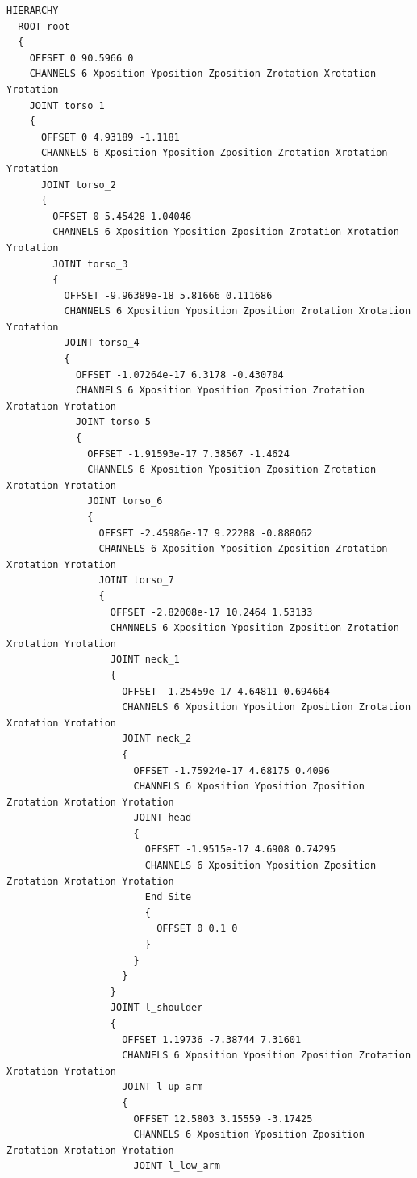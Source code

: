 \documentclass[a4j, fleqn, 12pt]{jsreport}
\begin{document}
\begin{lstlisting}[caption=mocopiのBVHファイル,label=BVH]
  HIERARCHY
  ROOT root
  {
    OFFSET 0 90.5966 0
    CHANNELS 6 Xposition Yposition Zposition Zrotation Xrotation Yrotation
    JOINT torso_1
    {
      OFFSET 0 4.93189 -1.1181
      CHANNELS 6 Xposition Yposition Zposition Zrotation Xrotation Yrotation
      JOINT torso_2
      {
        OFFSET 0 5.45428 1.04046
        CHANNELS 6 Xposition Yposition Zposition Zrotation Xrotation Yrotation
        JOINT torso_3
        {
          OFFSET -9.96389e-18 5.81666 0.111686
          CHANNELS 6 Xposition Yposition Zposition Zrotation Xrotation Yrotation
          JOINT torso_4
          {
            OFFSET -1.07264e-17 6.3178 -0.430704
            CHANNELS 6 Xposition Yposition Zposition Zrotation Xrotation Yrotation
            JOINT torso_5
            {
              OFFSET -1.91593e-17 7.38567 -1.4624
              CHANNELS 6 Xposition Yposition Zposition Zrotation Xrotation Yrotation
              JOINT torso_6
              {
                OFFSET -2.45986e-17 9.22288 -0.888062
                CHANNELS 6 Xposition Yposition Zposition Zrotation Xrotation Yrotation
                JOINT torso_7
                {
                  OFFSET -2.82008e-17 10.2464 1.53133
                  CHANNELS 6 Xposition Yposition Zposition Zrotation Xrotation Yrotation
                  JOINT neck_1
                  {
                    OFFSET -1.25459e-17 4.64811 0.694664
                    CHANNELS 6 Xposition Yposition Zposition Zrotation Xrotation Yrotation
                    JOINT neck_2
                    {
                      OFFSET -1.75924e-17 4.68175 0.4096
                      CHANNELS 6 Xposition Yposition Zposition Zrotation Xrotation Yrotation
                      JOINT head
                      {
                        OFFSET -1.9515e-17 4.6908 0.74295
                        CHANNELS 6 Xposition Yposition Zposition Zrotation Xrotation Yrotation
                        End Site
                        {
                          OFFSET 0 0.1 0
                        }
                      }
                    }
                  }
                  JOINT l_shoulder
                  {
                    OFFSET 1.19736 -7.38744 7.31601
                    CHANNELS 6 Xposition Yposition Zposition Zrotation Xrotation Yrotation
                    JOINT l_up_arm
                    {
                      OFFSET 12.5803 3.15559 -3.17425
                      CHANNELS 6 Xposition Yposition Zposition Zrotation Xrotation Yrotation
                      JOINT l_low_arm

\end{lstlisting}
\end{document}
